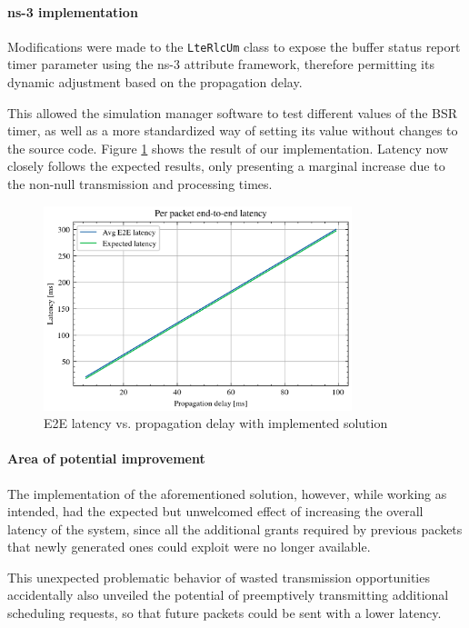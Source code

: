 \paragraph{ns-3 implementation}
Modifications were made to the \texttt{LteRlcUm} class to expose the buffer status report timer parameter using the ns-3 attribute framework, therefore permitting its dynamic adjustment based on the propagation delay. 

This allowed the simulation manager software to test different values of the \ac{BSR} timer, as well as a more standardized way of setting its value without changes to the source code. Figure \ref{fig:lat-improved} shows the result of our implementation. Latency now closely follows the expected results, only presenting a marginal increase due to the non-null transmission and processing times.

\begin{figure}[ht]
    \centering
    \includegraphics[width=0.8\textwidth]{res/lat_sched_after.png}
    \caption{E2E latency vs. propagation delay with implemented solution}
    \label{fig:lat-improved}
\end{figure}


\paragraph{Area of potential improvement}
The implementation of the aforementioned solution, however, while working as intended, had the expected but unwelcomed effect of increasing the overall latency of the system, since all the additional grants required by previous packets that newly generated ones could exploit were no longer available.

This unexpected problematic behavior of wasted transmission opportunities accidentally also unveiled the potential of preemptively transmitting additional scheduling requests, so that future packets could be sent with a lower latency.

